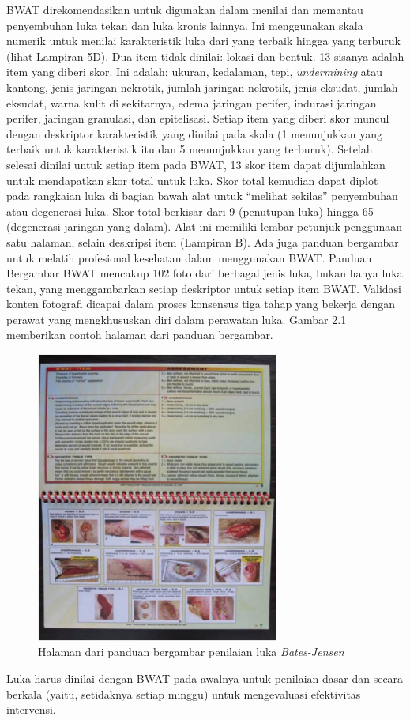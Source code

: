 BWAT direkomendasikan untuk digunakan dalam menilai dan memantau penyembuhan luka tekan dan luka kronis lainnya. Ini menggunakan skala numerik untuk menilai karakteristik luka dari yang terbaik hingga yang terburuk (lihat Lampiran 5D). Dua item tidak dinilai: lokasi dan bentuk. 13 sisanya adalah item yang diberi skor. Ini adalah: ukuran, kedalaman, tepi, \textit{undermining} atau kantong, jenis jaringan nekrotik, jumlah jaringan nekrotik, jenis eksudat, jumlah eksudat, warna kulit di sekitarnya, edema jaringan perifer, indurasi jaringan perifer, jaringan granulasi, dan epitelisasi. Setiap item yang diberi skor muncul dengan deskriptor karakteristik yang dinilai pada skala (1 menunjukkan yang terbaik untuk karakteristik itu dan 5 menunjukkan yang terburuk). Setelah selesai dinilai untuk setiap item pada BWAT, 13 skor item dapat dijumlahkan untuk mendapatkan skor total untuk luka. Skor total kemudian dapat diplot pada rangkaian luka di bagian bawah alat untuk “melihat sekilas” penyembuhan atau degenerasi luka. Skor total berkisar dari 9 (penutupan luka) hingga 65 (degenerasi jaringan yang dalam). Alat ini memiliki lembar petunjuk penggunaan satu halaman, selain deskripsi item (Lampiran B). Ada juga panduan bergambar untuk melatih profesional kesehatan dalam menggunakan BWAT. Panduan Bergambar BWAT mencakup 102 foto dari berbagai jenis luka, bukan hanya luka tekan, yang menggambarkan setiap deskriptor untuk setiap item BWAT. Validasi konten fotografi dicapai dalam proses konsensus tiga tahap yang bekerja dengan perawat yang mengkhususkan diri dalam perawatan luka. Gambar 2.1 memberikan contoh halaman dari panduan bergambar.
\begin{figure}[H]
	\centering
	\includegraphics[keepaspectratio, width=8cm]{gambar/panduan_bergambar}
	\caption{Halaman dari panduan bergambar penilaian luka \textit{Bates-Jensen} \citep{sussman2012}}
	\label{gambar:bates_jensen_assessment_tool}
\end{figure}
Luka harus dinilai dengan BWAT pada awalnya untuk penilaian dasar dan secara berkala (yaitu, setidaknya setiap minggu) untuk mengevaluasi efektivitas intervensi.

